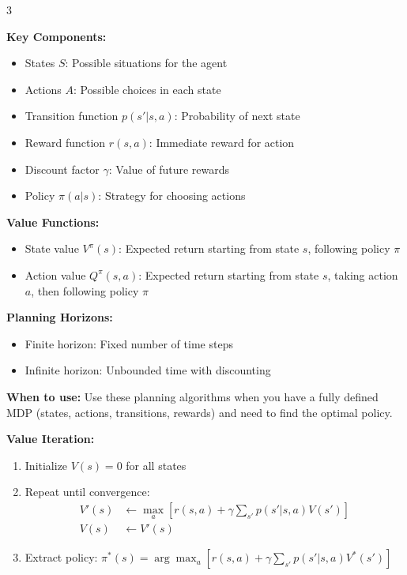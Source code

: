 \documentclass[10pt,landscape]{article}
\begin{document}
\begin{multicols}{3}
\begin{tcolorbox}[breakable, title=10. Markov Decision Processes Concepts, colback=mdp,boxsep=1pt,left=1pt,right=1pt,top=1pt,bottom=1pt]
\textbf{Key Components:}
\begin{itemize}[leftmargin=*,noitemsep,topsep=0pt]
    \item States $S$: Possible situations for the agent
    \item Actions $A$: Possible choices in each state
    \item Transition function $p(s'|s,a)$: Probability of next state
    \item Reward function $r(s,a)$: Immediate reward for action
    \item Discount factor $\gamma$: Value of future rewards
    \item Policy $\pi(a|s)$: Strategy for choosing actions
\end{itemize}

\textbf{Value Functions:}
\begin{itemize}[leftmargin=*,noitemsep,topsep=0pt]
    \item State value $V^\pi(s)$: Expected return starting from state $s$, following policy $\pi$
    \item Action value $Q^\pi(s,a)$: Expected return starting from state $s$, taking action $a$, then following policy $\pi$
\end{itemize}

\textbf{Planning Horizons:}
\begin{itemize}[leftmargin=*,noitemsep,topsep=0pt]
    \item Finite horizon: Fixed number of time steps
    \item Infinite horizon: Unbounded time with discounting
\end{itemize}
\end{tcolorbox}

\begin{tcolorbox}[breakable, title=10.1 MDP Planning Algorithms, colback=mdp,boxsep=1pt,left=1pt,right=1pt,top=1pt,bottom=1pt]
\textbf{When to use:} Use these planning algorithms when you have a fully defined MDP (states, actions, transitions, rewards) and need to find the optimal policy.

\textbf{Value Iteration:}
\begin{enumerate}[leftmargin=*,noitemsep,topsep=0pt]
    \item Initialize $V(s) = 0$ for all states
    \item Repeat until convergence:
    \begin{align}
    V'(s) &\leftarrow \max_a \left[r(s, a) + \gamma \sum_{s'} p(s'|s, a)V(s')\right]\\
    V(s) &\leftarrow V'(s)
    \end{align}
    \item Extract policy: 
    $\pi^*(s) = \arg\max_a \left[r(s, a) + \gamma \sum_{s'} p(s'|s, a)V^*(s')\right]$
\end{enumerate}


\end{tcolorbox}
\end{multicols}
\end{document}
